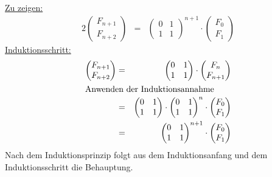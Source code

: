 \documentclass[10pt,a4paper,oneside,ngerman,numbers=noenddot]{scrartcl}
\begin{document}
		\underline{Zu zeigen:} 
		\begin{alignat*}{2}
			\begin{pmatrix}
		 		F_{n+1} \\
		 		F_{n+2}
			\end{pmatrix} &=& \begin{pmatrix}
		 		0 & 1 \\
			 	1 & 1
			\end{pmatrix}^{n+1} \cdot \begin{pmatrix}
			 	F_{0} \\
				F_{1}
			\end{pmatrix} 
		\end{alignat*}
		\underline{Induktionsschritt:}
		\begin{alignat*}{2}
			\begin{pmatrix}
		 		F_{n+1} \\
		 		F_{n+2}
			\end{pmatrix} &=& \begin{pmatrix}
		 		0 & 1 \\
			 	1 & 1
			\end{pmatrix} \cdot \begin{pmatrix}
			 	F_{n} \\
				F_{n+1}
			\end{pmatrix} \\
			\intertext{Anwenden der Induktionsannahme}
			&=& \begin{pmatrix}
		 		0 & 1 \\
			 	1 & 1
			\end{pmatrix} \cdot \begin{pmatrix}
		 		0 & 1 \\
			 	1 & 1
			\end{pmatrix}^{n} \cdot \begin{pmatrix}
			 	F_{0} \\
				F_{1}
			\end{pmatrix} \\
			&=& \begin{pmatrix}
		 		0 & 1 \\
			 	1 & 1
			\end{pmatrix}^{n+1} \cdot \begin{pmatrix}
			 	F_{0} \\
				F_{1}
			\end{pmatrix}
		\end{alignat*}
		Nach dem Induktionsprinzip folgt aus dem Induktionsanfang und dem Induktionsschritt die Behauptung.		
\end{document}
